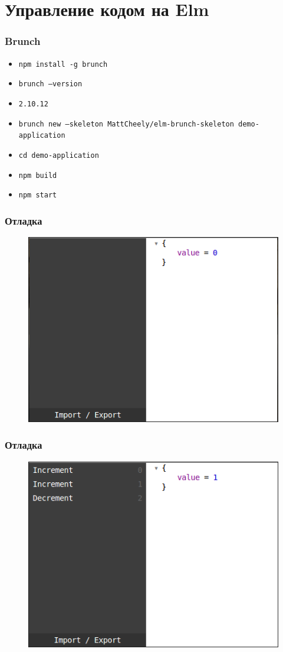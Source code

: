 \documentclass[11pt,aspectratio=169]{beamer}
\begin{document}
\section{Управление кодом на Elm}

\begin{frame}
\frametitle{Brunch}
\begin{itemize}
	\item \texttt{npm install -g brunch}
	\item \texttt{brunch --version}
	\item \texttt{2.10.12}
	\item \texttt{brunch new --skeleton MattCheely/elm-brunch-skeleton demo-application}
	\item \texttt{cd demo-application}
	\item \texttt{npm build}
	\item \texttt{npm start}
\end{itemize}
\end{frame}

\begin{frame}
\frametitle{Отладка}
\begin{figure}
	\includegraphics[scale=0.5]{elm-app-sample-state-0}
\end{figure}
\end{frame}

\begin{frame}
\frametitle{Отладка}
\begin{figure}
	\includegraphics[scale=0.5]{elm-app-sample-state-current}
\end{figure}
\end{frame}
\end{document}

